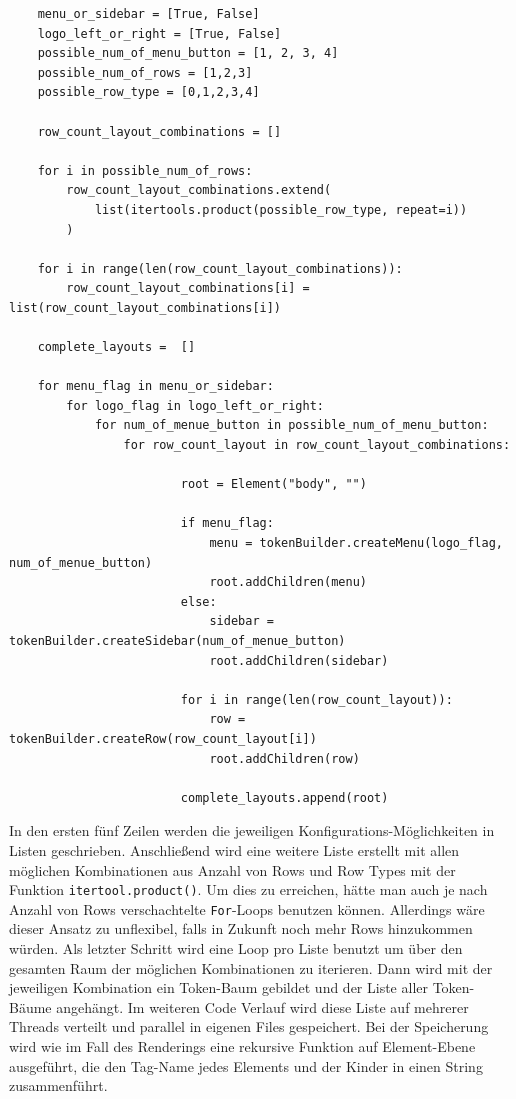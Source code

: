 \documentclass[pdftex,a4paper,halfparskip, article]{scrartcl}
\begin{document}
\begin{verbatim}
    menu_or_sidebar = [True, False]
    logo_left_or_right = [True, False]
    possible_num_of_menu_button = [1, 2, 3, 4]
    possible_num_of_rows = [1,2,3]
    possible_row_type = [0,1,2,3,4]

    row_count_layout_combinations = []

    for i in possible_num_of_rows:
        row_count_layout_combinations.extend( 
            list(itertools.product(possible_row_type, repeat=i))
        )

    for i in range(len(row_count_layout_combinations)):
        row_count_layout_combinations[i] = list(row_count_layout_combinations[i])

    complete_layouts =  []

    for menu_flag in menu_or_sidebar:
        for logo_flag in logo_left_or_right:
            for num_of_menue_button in possible_num_of_menu_button:
                for row_count_layout in row_count_layout_combinations:

                        root = Element("body", "")

                        if menu_flag:
                            menu = tokenBuilder.createMenu(logo_flag, num_of_menue_button)
                            root.addChildren(menu)
                        else:
                            sidebar = tokenBuilder.createSidebar(num_of_menue_button)
                            root.addChildren(sidebar)

                        for i in range(len(row_count_layout)):
                            row = tokenBuilder.createRow(row_count_layout[i])
                            root.addChildren(row)

                        complete_layouts.append(root)
\end{verbatim}

In den ersten fünf Zeilen werden die jeweiligen Konfigurations-Möglichkeiten in Listen geschrieben. Anschließend wird eine weitere Liste erstellt mit allen möglichen Kombinationen aus Anzahl von Rows und Row Types mit der Funktion \texttt{itertool.product()}. Um dies zu erreichen, hätte man auch je nach Anzahl von Rows verschachtelte \texttt{For}-Loops benutzen können. Allerdings wäre dieser Ansatz zu unflexibel, falls in Zukunft noch mehr Rows hinzukommen würden.
Als letzter Schritt wird eine Loop pro Liste benutzt um über den gesamten Raum der möglichen Kombinationen zu iterieren. Dann wird mit der jeweiligen Kombination ein Token-Baum gebildet und der Liste aller Token-Bäume angehängt. Im weiteren Code Verlauf wird diese Liste auf mehrerer Threads verteilt und parallel in eigenen Files gespeichert.
Bei der Speicherung wird wie im Fall des Renderings eine rekursive Funktion auf Element-Ebene ausgeführt, die den Tag-Name jedes Elements und der Kinder in einen String zusammenführt.
\end{document}
